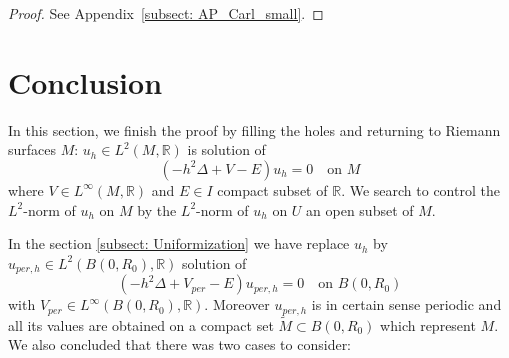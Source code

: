 \documentclass[leqno,11pt,letterpaper, english]{amsart}
\theoremstyle{plain}
\theoremstyle{definition}
\numberwithin{equation}{section}
\def\R{\mathbb R}
\begin{document}
\begin{proof}
See Appendix~\ref{subsect: AP_Carl_small}.
\end{proof}

\section{Conclusion}
\label{subsect: Conclusion}

In this section, we finish the proof by filling the holes and returning to Riemann surfaces $M$:
$u_{h}\in L^2(M,\R)$ is solution of $$(-h^2\Delta+V-E)u_{h}=0\quad \mbox{on } M$$ 
where $V\in L^\infty (M,\R)$ and $E\in I$ compact subset of $\R$. We search to control the $L^2$-norm of $u_h$ on $M$ by the $L^2$-norm of $u_h$ on $U$ an open subset of $M$.

In the section \ref{subsect: Uniformization} we have replace $u_{h}$ by $u_{per,h} \in L^2(B(0,R_0),\R)$ solution of $$(-h^2\Delta+V_{per}-E)u_{per,h}=0\quad \mbox{on } B(0,R_0)$$
with $V_{per} \in L^\infty (B(0,R_0),\R)$. Moreover $u_{per,h}$ is in certain sense periodic and all its values are obtained on a compact set $\tilde{M} \subset B(0,R_0)$ which represent $M$.  
We also concluded that there was two cases to consider:
\end{document}
